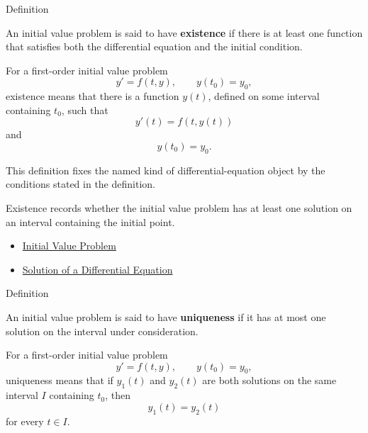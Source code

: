 \begin{definitionbox}{Definition}
\begin{definition}[Existence]
\label{def:ordinary-differential-equations-solutions-existence}
An initial value problem is said to have \textbf{existence} if there is at least one function that satisfies both the differential equation and the initial condition.

For a first-order initial value problem
\[
y'=f(t,y),
\qquad
y(t_0)=y_0,
\]
existence means that there is a function $y(t)$, defined on some interval containing $t_0$, such that
\[
y'(t)=f(t,y(t))
\]
and
\[
y(t_0)=y_0.
\]
\end{definition}
\end{definitionbox}

\begin{remark*}
This definition fixes the named kind of differential-equation object by the
conditions stated in the definition.
\end{remark*}

\begin{remark*}[Interpretation]
Existence records whether the initial value problem has at least one solution
on an interval containing the initial point.
\end{remark*}

\begin{dependencies}
\begin{itemize}
  \item \hyperref[def:ordinary-differential-equations-solutions-initial-value-problem]{Initial Value Problem}
  \item \hyperref[def:ordinary-differential-equations-terminology-solution-of-a-differential-equation]{Solution of a Differential Equation}
\end{itemize}
\end{dependencies}

\begin{definitionbox}{Definition}
\begin{definition}[Uniqueness]
\label{def:ordinary-differential-equations-solutions-uniqueness}
An initial value problem is said to have \textbf{uniqueness} if it has at most one solution on the interval under consideration.

For a first-order initial value problem
\[
y'=f(t,y),
\qquad
y(t_0)=y_0,
\]
uniqueness means that if $y_1(t)$ and $y_2(t)$ are both solutions on the same interval $I$ containing $t_0$, then
\[
y_1(t)=y_2(t)
\]
for every $t\in I$.
\end{definition}
\end{definitionbox}

